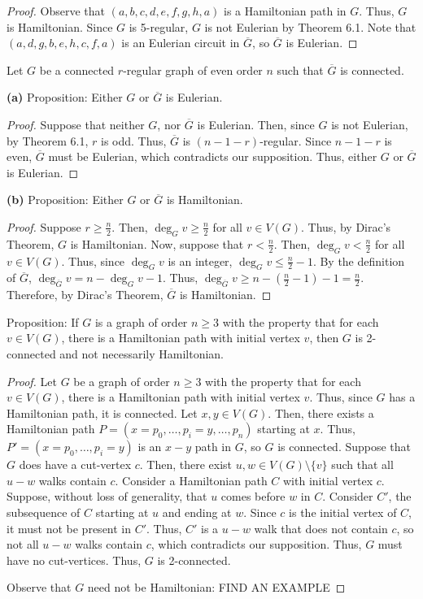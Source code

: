 \documentclass[12pt]{article}
\begin{document}
\begin{proof}
	Observe that $(a,b,c,d,e,f,g,h,a)$ is a Hamiltonian path in $G$.
	Thus, $G$ is Hamiltonian.
	Since $G$ is 5-regular, $G$ is not Eulerian by Theorem 6.1.
	Note that $(a,d,g,b,e,h,c,f,a)$ is an Eulerian circuit in $\overline G$, so $\overline G$ is Eulerian.

\end{proof}

\newpage{} Let $G$ be a connected $r$-regular graph of even order $n$ such that $\overline G$ is connected.

{\bf (a)} Proposition: Either $G$ or $\overline G$ is Eulerian.
\begin{proof}
	Suppose that neither $G$, nor $\overline G$ is Eulerian.
	Then, since $G$ is not Eulerian, by Theorem 6.1, $r$ is odd.
	Thus, $\overline G$ is $(n-1-r)$-regular.
	Since $n-1-r$ is even, $\overline G$ must be Eulerian, which contradicts our supposition.
	Thus, either $G$ or $\overline G$ is Eulerian.
\end{proof}

{\bf (b)} Proposition: Either $G$ or $\overline G$ is Hamiltonian.
\begin{proof}
	Suppose $r \geq \frac{n}{2}$.
	Then, $\deg_G v \geq \frac{n}{2}$ for all $v \in V(G)$.
	Thus, by Dirac's Theorem, $G$ is Hamiltonian.
	Now, suppose that $r < \frac{n}{2}$.
	Then, $\deg_G v < \frac{n}{2}$ for all $v \in V(G)$.
	Thus, since $\deg_G v$ is an integer, $\deg_G v \leq \frac n2 - 1$.
	By the definition of $\overline G$, $\deg_{\overline G}v = n - \deg_Gv-1$.
	Thus, $\deg_{\overline G}v \geq n - (\frac n2 - 1) - 1 = \frac n2$.
	Therefore, by Dirac's Theorem, $\overline{G}$ is Hamiltonian.
\end{proof}

\newpage{} Proposition: If $G$ is a graph of order $n \geq 3$ with the property that for each $v \in V(G)$, there is a Hamiltonian path with initial vertex $v$, then $G$ is 2-connected and not necessarily Hamiltonian.
\begin{proof}
	Let $G$ be a graph of order $n \geq 3$ with the property that for each $v \in V(G)$, there is a Hamiltonian path with initial vertex $v$.
	Thus, since $G$ has a Hamiltonian path, it is connected.
	Let $x, y \in V(G)$.
	Then, there exists a Hamiltonian path $P = (x = p_0, \hdots, p_i = y, \hdots, p_n)$ starting at $x$.
	Thus, $P' = (x = p_0, \hdots, p_i = y)$ is an $x-y$ path in $G$, so $G$ is connected.
	Suppose that $G$ does have a cut-vertex $c$.
	Then, there exist $u,w \in V(G) \setminus \{v\}$ such that all $u-w$ walks contain $c$.
	Consider a Hamiltonian path $C$ with initial vertex $c$.
	Suppose, without loss of generality, that $u$ comes before $w$ in $C$.
	Consider $C'$, the subsequence of $C$ starting at $u$ and ending at $w$.
	Since $c$ is the initial vertex of $C$, it must not be present in $C'$.
	Thus, $C'$ is a $u-w$ walk that does not contain $c$, so not all $u-w$ walks contain $c$, which contradicts our supposition.
	Thus, $G$ must have no cut-vertices.
	Thus, $G$ is 2-connected.

	Observe that $G$ need not be Hamiltonian: FIND AN EXAMPLE

\end{proof}
\end{document}
